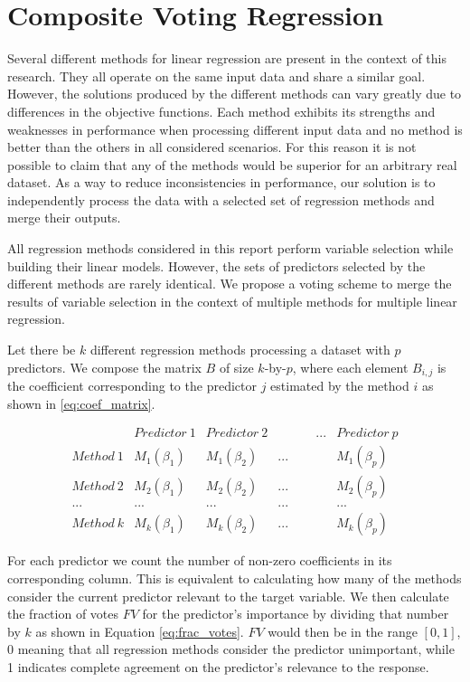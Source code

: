 \chapter{Composite Voting Regression}
Several different methods for linear regression are present in the context of this research. They all operate on the same input data and share a similar goal. However, the solutions produced by the different methods can vary greatly due to differences in the objective functions. Each method exhibits its strengths and weaknesses in performance when processing different input data and no method is better than the others in all considered scenarios. For this reason it is not possible to claim that any of the methods would be superior for an arbitrary real dataset. As a way to reduce inconsistencies in performance, our solution is to independently process the data with a selected set of regression methods and merge their outputs. 

All regression methods considered in this report perform variable selection while building their linear models. However, the sets of predictors selected by the different methods are rarely identical. We propose a voting scheme to merge the results of variable selection in the context of multiple methods for multiple linear regression. 

Let there be $k$ different regression methods processing a dataset with $p$ predictors. We compose the matrix $B$ of size $k$-by-$p$, where each element $B_{i,j}$ is the coefficient corresponding to the predictor $j$ estimated by the method $i$ as shown in \ref{eq:coef_matrix}. 

{\def\arraystretch{1.5}\tabcolsep=10pt
\begin{equation} \label{eq:coef_matrix}
\begin{array}{l|rrrr} 
& Predictor\ 1 & Predictor\ 2 & \quad\quad\quad... & Predictor\ p \\
\hline	
Method\ 1 & M_1(\beta_1) & M_1(\beta_2) & ... & M_1(\beta_p) \\
Method\ 2 & M_2(\beta_1) & M_2(\beta_2) & ... & M_2(\beta_p) \\
... & ... & ... & ... & ... \\
Method\ k & M_k(\beta_1) & M_k(\beta_2) & ... & M_k(\beta_p)
\end{array}
\end{equation}
}

For each predictor we count the number of non-zero coefficients in its corresponding column. This is equivalent to calculating how many of the methods consider the current predictor relevant to the target variable. We then calculate the fraction of votes $FV$ for the predictor's importance by dividing that number by $k$ as shown in Equation \ref{eq:frac_votes}. $FV$ would then be in the range $[0,1]$, $0$ meaning that all regression methods consider the predictor unimportant, while 1 indicates complete agreement on the predictor's relevance to the response.

